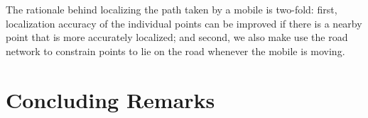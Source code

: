 \documentclass[conference, 10pt]{IEEEtran}
\begin{document}
The rationale behind localizing the path taken by a mobile is two-fold: first,
localization accuracy of the individual points can be improved if there is a
nearby point that is more accurately localized; and second, we also make use the
road network to constrain points to lie on the road whenever the mobile is
moving. 



\section{Concluding Remarks}
\label{sec:concl}





%
%    

{%


}
\end{document}
